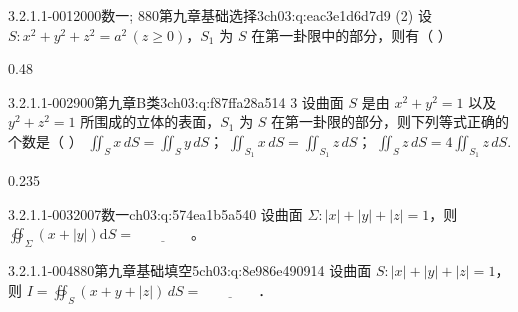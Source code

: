 \par\addvspace{2.4ex}\noindent
\begin{minipage}{\linewidth}



\begin{q}{3.2.1.1-001}{2000数一; 880第九章基础选择3}{ch03:q:eac3e1d6d7d9}
(2) 设 $S: x^2+y^2+z^2=a^2\,(z\geqslant 0)$，$S_1$ 为 $S$ 在第一卦限中的部分，则有（ ）
\begin{opts}{0.48}
\hfill{}\\[0.3ex]
\hfill{}
\end{opts}
\end{q}
\end{minipage}


\begin{q}{3.2.1.1-002}{900第九章B类3}{ch03:q:f87ffa28a514}
3 设曲面 $S$ 是由 $x^2+y^2=1$ 以及 $y^2+z^2=1$ 所围成的立体的表面，$S_1$ 为 $S$ 在第一卦限的部分，则下列等式正确的个数是（  ）
 $\displaystyle \iint_S x\,dS=\iint_S y\,dS$；  $\displaystyle \iint_{S_1} x\,dS=\iint_{S_1} z\,dS$；  $\displaystyle \iint_S z\,dS=4\iint_{S_1} z\,dS$.
\begin{opts}{0.235}
\hfill{}\hfill{}\hfill{}
\end{opts}
\end{q}

\begin{q}{3.2.1.1-003}{2007数一}{ch03:q:574ea1b5a540}
设曲面 $\Sigma:|x|+|y|+|z|=1$，则 $\oiint_{\Sigma}(x+|y|)\mathrm{d}S=\underline{\hspace{4em}}$。
\end{q}

\begin{q}{3.2.1.1-004}{880第九章基础填空5}{ch03:q:8e986e490914}
设曲面 $S:|x|+|y|+|z|=1$，则 $I=\oiint_S (x+y+|z|)\,dS=\underline{\hspace{4em}}$．
\end{q}

